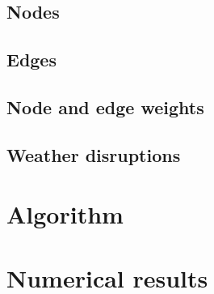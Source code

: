 \documentclass[12pt]{article}
\begin{document}
\subsection{Nodes}\label{subsec:nodes}

\subsection{Edges}\label{subsec:edges}

\subsection{Node and edge weights}\label{subsec:weights}

\subsection{Weather disruptions}\label{subsec:weather}

\section{Algorithm}\label{sec:algorithm}

\section{Numerical results}\label{sec:numerics}

\end{document}
